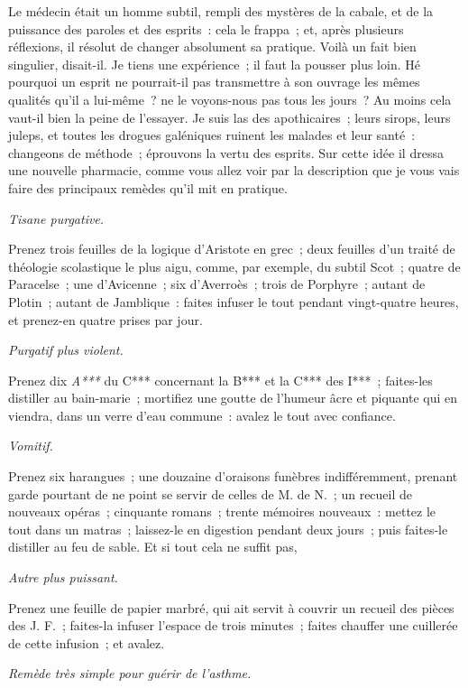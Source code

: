\documentclass[french,twoside]{book} %
\begin{document}
Le médecin était un homme subtil, rempli des mystères de la cabale, et de la puissance des paroles et des esprits : cela le frappa ; et, après plusieurs réflexions, il résolut de changer absolument sa pratique. Voilà un fait bien singulier, disait-il. Je tiens une expérience ; il faut la pousser plus loin. Hé pourquoi un esprit ne pourrait-il pas transmettre à son ouvrage les mêmes qualités qu’il a lui-même ? ne le voyons-nous pas tous les jours ? Au moins cela vaut-il bien la peine de l’essayer. Je suis las des apothicaires ; leurs sirops, leurs juleps, et toutes les drogues galéniques ruinent les malades et leur santé : changeons de méthode ; éprouvons la vertu des esprits. Sur cette idée il dressa une nouvelle pharmacie, comme vous allez voir par la description que je vous vais faire des principaux remèdes qu’il mit en pratique.\par
 {\itshape Tisane purgative.} \par
Prenez trois feuilles de la logique d’Aristote en grec ; deux feuilles d’un traité de théologie scolastique le plus aigu, comme, par exemple, du subtil Scot ; quatre de Paracelse ; une d’Avicenne ; six d’Averroès ; trois de Porphyre ; autant de Plotin ; autant de Jamblique : faites infuser le tout pendant vingt-quatre heures, et prenez-en quatre prises par jour.\par
 {\itshape Purgatif plus violent.} \par
Prenez dix {\itshape A***} du C*** concernant la B*** et la C*** des I*** ; faites-les distiller au bain-marie ; mortifiez une goutte de l’humeur âcre et piquante qui en viendra, dans un verre d’eau commune : avalez le tout avec confiance.\par
 {\itshape Vomitif.} \par
Prenez six harangues ; une douzaine d’oraisons funèbres indifféremment, prenant garde pourtant de ne point se servir de celles de M. de N. ; un recueil de nouveaux opéras ; cinquante romans ; trente mémoires nouveaux : mettez le tout dans un matras ; laissez-le en digestion pendant deux jours ; puis faites-le distiller au feu de sable. Et si tout cela ne suffit pas,\par
 {\itshape Autre plus puissant.} \par
Prenez une feuille de papier marbré, qui ait servit à couvrir un recueil des pièces des J. F. ; faites-la infuser l’espace de trois minutes ; faites chauffer une cuillerée de cette infusion ; et avalez.\par
 {\itshape Remède très simple pour guérir de l’asthme.} \par
\end{document}
